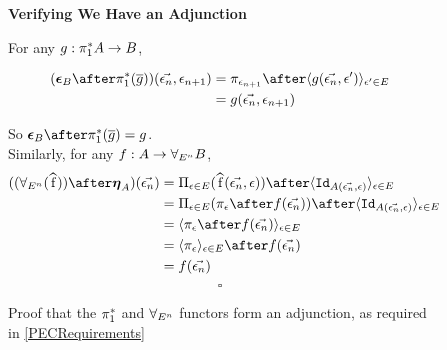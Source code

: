 \documentclass{Report}
\begin{document}
\begin{figure}
    \begin{framed}
        \centering
        \textbf{Verifying We Have an Adjunction}

        \centering
        For any $g: \pi_1^* A \rightarrow B$,
        
        \begin{align*}
            (\counit{B}\after\pstar(\bar{g}))(\env, \e_{n+1}) & = \pi_{\e_{n+1}}\after\finpr{g(\env, \e')}{\e'\in E}\\
            &= g(\env, \e_{n+1})
        \end{align*}
        
        \centering
        So $\counit{B}\after\pstar(\bar{g}) = g$.
\\


        Similarly, for any $f: A \rightarrow \forall_{E^n} B$,
        \begin{align*}
            ((\allEn(\widehat{f}))\after\unit{A})(\env) & = \Pi_{\e\in E}(\widehat{f}(\env, \e))\after \finpr{\Id{A(\env, \e)}}{\e\in E}\\
            & = \Pi_{\e\in E}(\pi_\e\after f(\env))\after \finpr{\Id{A(\env, \e)}}{\e\in E}\\
            & =  \finpr{\pi_\e\after f(\env)}{\e\in E}\\
            & = \finpr{\pi_\e}{\e\in E}\after f(\env)\\
            & = f(\env)
        \end{align*}
        $$\square$$
    \end{framed}
    \caption{Proof that the $\pi_1^*$ and $\forall_{E^n}$ functors form an adjunction, as required in \ref{PECRequirements}}
    \label{AdjunctionProof}
\end{figure}
\end{document}
